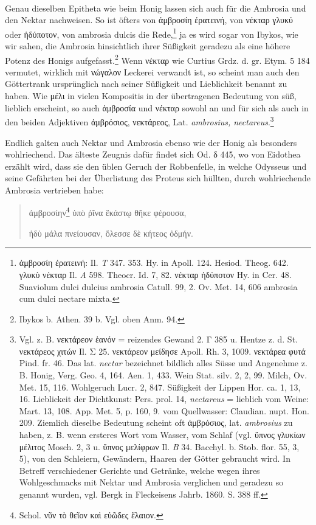\documentclass[a4paper, 11pt, oneside]{article}
\begin{document}
\paragraph{}
Genau dieselben Epitheta wie beim Honig lassen sich auch für die Ambrosia und den Nektar nachweisen. So ist öfters von ἀμβροσίη ἐρατεινή, von νέκταρ γλυκύ oder ἡδύποτον, von ambrosia dulcis die Rede,\footnote{ἀμβροσίη ἐρατεινή: Il. \emph{T} 347. 353. Hy. in Apoll. 124. Hesiod. Theog. 642. γλυκὺ νέκταρ Il. \emph{A} 598. Theocr. Id. 7, 82. νέκταρ ἡδύποτον Hy. in Cer. 48. Suaviolum dulci dulcius ambrosia Catull. 99, 2. Ov. Met. 14, 606 ambrosia cum dulci nectare mixta.} ja es wird sogar von Ibykos, wie wir sahen, die Ambrosia hinsichtlich ihrer Süßigkeit geradezu als eine höhere Potenz des Honigs aufgefasst.\footnote{Ibykos b. Athen. 39 b. Vgl. oben Anm. 94.} Wenn νέκταρ wie Curtius Grdz. d. gr. Etym. 5 184 vermutet, wirklich mit νώγαλον Leckerei verwandt ist, so scheint man auch den Göttertrank ursprünglich nach seiner Süßigkeit und Lieblichkeit benannt zu haben. Wie μέλι in vielen Kompositis in der übertragenen Bedeutung von süß, lieblich erscheint, so auch ἀμβροσία und νέκταρ sowohl an und für sich als auch in den beiden Adjektiven ἀμβρόσιος, νεκτάρεος, Lat. \emph{ambrosius, nectareus}.\footnote{Vgl. z. B. νεκτάρεον ἑανόν = reizendes Gewand 2. Γ 385 u. Hentze z. d. St. νεκτάρεος χιτών Il. Σ 25. νεκτάρεον μείδησε Apoll. Rh. 3, 1009. νεκτάρεα φυτά Pind. fr. 46. Das lat. \emph{nectar} bezeichnet bildlich alles Süsse und Angenehme z. B. Honig, Verg. Geo. 4, 164. Aen. 1, 433. Wein Stat. silv. 2, 2, 99. Milch, Ov. Met. 15, 116. Wohlgeruch Lucr. 2, 847. Süßigkeit der Lippen Hor. ca. 1, 13, 16. Lieblickeit der Dichtkunst: Pers. prol. 14, \emph{nectareus} = lieblich vom Weine: Mart. 13, 108. App. Met. 5, p. 160, 9. vom Quellwasser: Claudian. nupt. Hon. 209. Ziemlich dieselbe Bedeutung scheint oft ἀμβρόσιος, lat. \emph{ambrosius} zu haben, z. B. wenn ersteres Wort vom Wasser, vom Schlaf (vgl. ὕπνος γλυκίων μέλιτος Mosch. 2, 3 u. ὕπνος μελίφρων Il. \emph{B} 34. Bacchyl. b. Stob. flor. 55, 3, 5), von den Schleiern, Gewändern, Haaren der Götter gebraucht wird. In Betreff verschiedener Gerichte und Getränke, welche wegen ihres Wohlgeschmacks mit Nektar und Ambrosia verglichen und geradezu so genannt wurden, vgl. Bergk in Fleckeisens Jahrb. 1860. S. 388 ff.}

Endlich galten auch Nektar und Ambrosia ebenso wie der Honig als besonders wohlriechend. Das älteste Zeugnis dafür findet sich Od. δ 445, wo von Eidothea erzählt wird, dass sie den üblen Geruch der Robbenfelle, in welche Odysseus und seine Gefährten bei der Überlistung des Proteus sich hüllten, durch wohlriechende Ambrosia vertrieben habe:
\begin{quotation}
ἀμβροσίην\footnote{Schol. νῦν τὸ θεῖον καὶ εὐῶδες ἔλαιον.} ὑπὸ ῥῖνα ἓκάστῳ θῆκε φέρουσα,

ἡδὺ μάλα πνείουσαν, ὅλεσσε δὲ κήτεος ὀδμήν.
\end{quotation}
\end{document}
